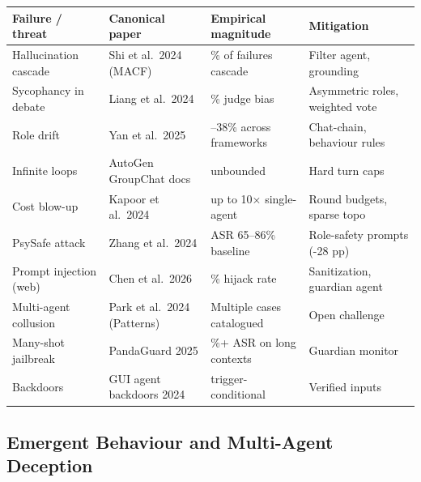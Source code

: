 {\def\LTcaptype{none} %
\begin{longtable}[]{@{}
  >{\raggedright\arraybackslash}p{}
  >{\raggedright\arraybackslash}p{}
  >{\raggedright\arraybackslash}p{}
  >{\raggedright\arraybackslash}p{}@{}}
\toprule\noalign{}
\begin{minipage}[b]{\linewidth}\raggedright
Failure / threat
\end{minipage} & \begin{minipage}[b]{\linewidth}\raggedright
Canonical paper
\end{minipage} & \begin{minipage}[b]{\linewidth}\raggedright
Empirical magnitude
\end{minipage} & \begin{minipage}[b]{\linewidth}\raggedright
Mitigation
\end{minipage} \\
\midrule\noalign{}
\endhead
\bottomrule\noalign{}
\endlastfoot
Hallucination cascade & Shi et al.~2024 (MACF) & 22\% of failures cascade & Filter agent, grounding \\
Sycophancy in debate & Liang et al.~2024 & 17\% judge bias & Asymmetric roles, weighted vote \\
Role drift & Yan et al.~2025 & 4--38\% across frameworks & Chat-chain, behaviour rules \\
Infinite loops & AutoGen GroupChat docs & unbounded & Hard turn caps \\
Cost blow-up & Kapoor et al.~2024 & up to 10× single-agent & Round budgets, sparse topo \\
PsySafe attack & Zhang et al.~2024 & ASR 65--86\% baseline & Role-safety prompts (-28 pp) \\
Prompt injection (web) & Chen et al.~2026 & 41\% hijack rate & Sanitization, guardian agent \\
Multi-agent collusion & Park et al.~2024 (Patterns) & Multiple cases catalogued & Open challenge \\
Many-shot jailbreak & PandaGuard 2025 & 70\%+ ASR on long contexts & Guardian monitor \\
Backdoors & GUI agent backdoors 2024 & trigger-conditional & Verified inputs \\
\end{longtable}
}

\subsection{Emergent Behaviour and Multi-Agent Deception}\label{emergent-behaviour-and-multi-agent-deception}

